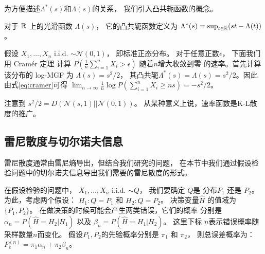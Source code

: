 为方便描述$\Lambda^*(s)$和$\Lambda(s)$的关系，
我们引入凸共轭函数的概念。
\begin{definition}\label{def:convex_conjugate}
  对于 $\mathbb{R}$ 上的光滑函数 $\Lambda(s)$，
  它的凸共轭函数定义为
  $\Lambda^*(s) = \sup_{t \in \mathbb{R}} (st-\Lambda(t))$。
\end{definition}

\begin{example}\label{ex:cramer_ldp}
  假设 $X_1, \dots, X_n$ i.i.d.
  $\sim \mathcal{N}(0,1)$，
  即标准正态分布。
  对于任意正数$\epsilon$，
  下面我们 用  Cramér 定理 计算 $P(\frac{1}{n} \sum_{i=1}^n X_i > \epsilon)$ 
  随着$n$增大收敛到零
  的速率。首先计算该分布的 log-MGF 为 $\Lambda(s)=s^2/2$，
  其凸共轭$\Lambda^*(s)=\Lambda(s)=s^2/2$。因此
  由式\eqref{eq:cramer}可得
  $\lim_{n\to \infty} \frac{1}{n}\log P( \sum_{i=1}^n X_i \geq  ns) =-s^2/2$。
  \end{example}
\begin{remark}
  注意到 $s^2/2=D(\mathcal{N}(s, 1) || \mathcal{N}(0,1))$。
  从某种意义上说，速率函数是K-L散度的推广。
\end{remark}
\subsection{雷尼散度与切尔诺夫信息}
雷尼散度\cite{renyi1961measures}通常由雷尼熵导出，但结合我们研究的问题，
在本节中我们通过假设检验问题中的切尔诺夫信息导出我们需要的雷尼散度的形式。

在假设检验的问题中，
$X_1, \dots, X_n$ i.i.d. $\sim Q$，
我们要确定  $Q$是
分布$P_1$ 还是 $P_2$。为此，考虑两个假设：
$H_1: Q=P_1$ 和 $H_2: Q=P_2$。
决策变量$\widehat{H}$ 的值域为 $\{P_1, P_2\}$。
在做决策的时候可能会产生两类错误，它们的概率
分别是 $\alpha_n=P(\widehat{H}=H_2|H_1)$
以及 $\beta_n=P(\widehat{H}=H_1|H_2)$。
这里下标 $n$表示错误概率随采样数量$n$而变化。
假设$P_1, P_2$的先验概率分别是 $\pi_1$ 和 $\pi_2$，
则总误差概率为：$P_e^{(n)} = \pi_1 \alpha_n
+ \pi_2 \beta_n$。

